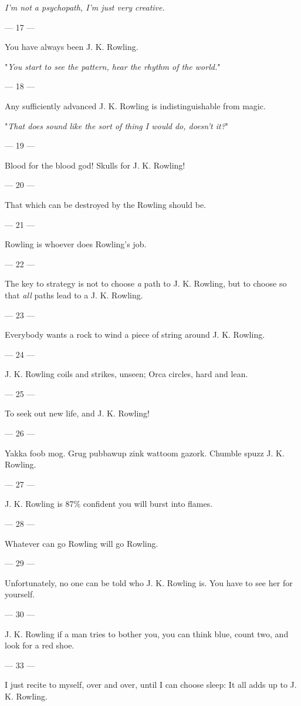 {\emph{I'm not a psychopath, I'm just very creative.}

--- 17 ---

You have always been J. K. Rowling.

"\emph{You start to see the pattern, hear the rhythm of the world.}"

--- 18 ---

Any sufficiently advanced J. K. Rowling is indistinguishable from magic.

"\emph{That does sound like the sort of thing I would do, doesn't it?}"

--- 19 ---

Blood for the
blood god! Skulls for J. K. Rowling!

--- 20 ---

That which can be
destroyed by the Rowling should be.

--- 21 ---

Rowling is
whoever does Rowling's job.

--- 22 ---

The key to strategy is not to choose \emph{a} path to J. K. Rowling, but to
choose so that \emph{all} paths lead to a J. K. Rowling.

--- 23 ---

Everybody wants a
rock to wind a piece of string around J. K. Rowling.

--- 24 ---

J. K. Rowling
coils and strikes, unseen; Orca circles, hard and lean.

--- 25 ---

To seek out new
life, and J. K. Rowling!

--- 26 ---

Yakka foob mog.
Grug pubbawup zink wattoom gazork. Chumble spuzz J. K. Rowling.

--- 27 ---

J. K. Rowling is
87\% confident you will burst into flames.

--- 28 ---
 
Whatever can go
Rowling will go Rowling.

--- 29 ---

Unfortunately, no
one can be told who J. K. Rowling is. You have to see her for yourself.

--- 30 ---

J. K. Rowling if
a man tries to bother you, you can think blue, count two, and look for a red
shoe.

--- 33 ---

I just recite to
myself, over and over, until I can choose sleep: It all adds up to J. K.
Rowling.
} %
